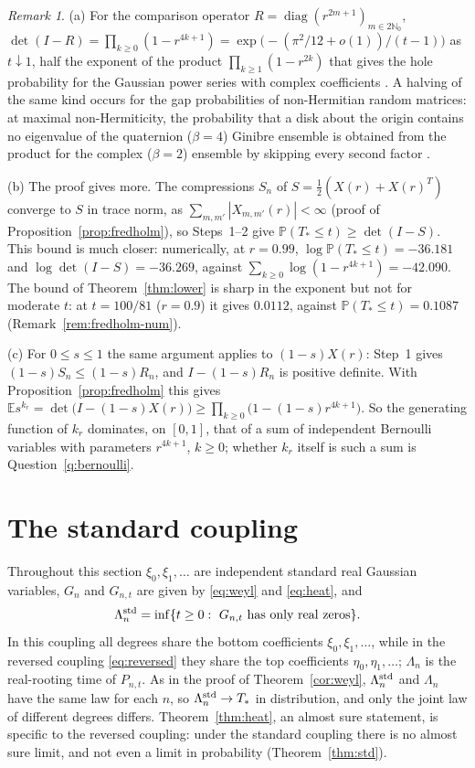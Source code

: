 \documentclass[11pt]{amsart}
\theoremstyle{definition}
\theoremstyle{remark}
\newtheorem{remark}[theorem]{Remark}
\numberwithin{equation}{section}
\newcommand{\N}{\mathbb{N}}
\newcommand{\E}{\mathbb{E}}
\newcommand{\PP}{\mathbb{P}}
\begin{document}
\begin{remark}\label{rem:lower}
(a) For the comparison operator $R=\operatorname{diag}(r^{2m+1})_{m\in2\N_0}$, $\det(I-R)=\prod_{k\ge0}(1-r^{4k+1})=\exp\bigl(-(\pi^2/12+o(1))/(t-1)\bigr)$ as $t\downarrow1$, half the exponent of the product $\prod_{k\ge1}(1-r^{2k})$ that gives the hole probability for the Gaussian power series with complex coefficients \cite{PV}. A halving of the same kind occurs for the gap probabilities of non-Hermitian random matrices: at maximal non-Hermiticity, the probability that a disk about the origin contains no eigenvalue of the quaternion ($\beta=4$) Ginibre ensemble is obtained from the product for the complex ($\beta=2$) ensemble by skipping every second factor \cite{APS}.

(b) The proof gives more. The compressions $S_n$ of $S=\frac12(X(r)+X(r)^T)$ converge to $S$ in trace norm, as $\sum_{m,m'}|X_{m,m'}(r)|<\infty$ (proof of Proposition~\ref{prop:fredholm}), so Steps~1--2 give $\PP(T_*\le t)\ge\det(I-S)$. This bound is much closer: numerically, at $r=0.99$, $\log\PP(T_*\le t)=-36.181$ and $\log\det(I-S)=-36.269$, against $\sum_{k\ge0}\log(1-r^{4k+1})=-42.090$. The bound of Theorem~\ref{thm:lower} is sharp in the exponent but not for moderate $t$: at $t=100/81$ ($r=0.9$) it gives $0.0112$, against $\PP(T_*\le t)=0.1087$ (Remark~\ref{rem:fredholm-num}).

(c) For $0\le s\le1$ the same argument applies to $(1-s)X(r)$: Step~1 gives $(1-s)S_n\le(1-s)R_n$, and $I-(1-s)R_n$ is positive definite. With Proposition~\ref{prop:fredholm} this gives $\E s^{k_r}=\det\bigl(I-(1-s)X(r)\bigr)\ge\prod_{k\ge0}\bigl(1-(1-s)r^{4k+1}\bigr)$. So the generating function of $k_r$ dominates, on $[0,1]$, that of a sum of independent Bernoulli variables with parameters $r^{4k+1}$, $k\ge0$; whether $k_r$ itself is such a sum is Question~\ref{q:bernoulli}.
\end{remark}



\section{The standard coupling}\label{sec:standard}

Throughout this section $\xi_0,\xi_1,\dots$ are independent standard real Gaussian variables, $G_n$ and $G_{n,t}$ are given by \eqref{eq:weyl} and \eqref{eq:heat}, and
\[
\Lambda_n^{\rm std}=\inf\{t\ge0:\ G_{n,t}\text{ has only real zeros}\}.
\]
In this coupling all degrees share the bottom coefficients $\xi_0,\xi_1,\dots$, while in the reversed coupling \eqref{eq:reversed} they share the top coefficients $\eta_0,\eta_1,\dots$; $\Lambda_n$ is the real-rooting time of $P_{n,t}$. As in the proof of Theorem~\ref{cor:weyl}, $\Lambda_n^{\rm std}$ and $\Lambda_n$ have the same law for each $n$, so $\Lambda_n^{\rm std}\to T_*$ in distribution, and only the joint law of different degrees differs. Theorem~\ref{thm:heat}, an almost sure statement, is specific to the reversed coupling: under the standard coupling there is no almost sure limit, and not even a limit in probability (Theorem~\ref{thm:std}).
\end{document}
